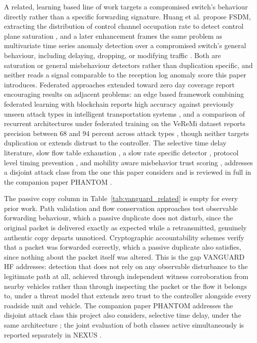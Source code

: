 \documentclass[final,5p,twocolumn]{elsarticle}
\theoremstyle{remark}
\theoremstyle{plain}
\begin{document}
A related, learning based line of work targets a compromised switch's
behaviour directly rather than a specific forwarding signature. Huang et
al. propose FSDM, extracting the distribution of control channel
occupation rate to detect control plane saturation \cite{Huang2020}, and
a later enhancement frames the same problem as multivariate time series
anomaly detection over a compromised switch's general behaviour,
including delaying, dropping, or modifying traffic \cite{Chi2020}. Both
are saturation or general misbehaviour detectors rather than duplication
specific, and neither reads a signal comparable to the reception log
anomaly score this paper introduces. Federated approaches extended toward
zero day coverage report encouraging results on adjacent problems: an
edge based framework combining federated learning with blockchain reports
high accuracy against previously unseen attack types in intelligent
transportation systems \cite{AbouElHouda2024}, and a comparison of
recurrent architectures under federated training on the VeReMi dataset
reports precision between 68 and 94 percent across attack types
\cite{Mansouri2024}, though neither targets duplication or extends
distrust to the controller. The selective time delay literature, slow
flow table exhaustion \cite{Pascoal2017,Pascoal2020DoS,Cao2022LOFT}, a
slow rate specific detector \cite{Tang2023SFTOGuard}, protocol level
timing prevention \cite{Arsalan2018}, and mobility aware misbehavior
trust scoring \cite{Nayak2022}, addresses a disjoint attack class from
the one this paper considers and is reviewed in full in the companion
paper PHANTOM \cite{Phantom2026}.

The passive copy column in Table~\ref{tab:vanguard_related} is empty for
every prior work. Path validation and flow conservation approaches test
observable forwarding behaviour, which a passive duplicate does not disturb,
since the original packet is delivered exactly as expected while a
retransmitted, genuinely authentic copy departs unnoticed. Cryptographic
accountability schemes verify that a packet was forwarded correctly, which a
passive duplicate also satisfies, since nothing about the packet itself was
altered. This is the gap VANGUARD HF addresses: detection that does not rely
on any observable disturbance to the legitimate path at all, achieved through
independent witness corroboration from nearby vehicles rather than through
inspecting the packet or the flow it belongs to, under a threat model that
extends zero trust to the controller alongside every roadside unit and
vehicle. The companion paper PHANTOM addresses the disjoint attack class this
project also considers, selective time delay, under the same architecture
\cite{Phantom2026}; the joint evaluation of both classes active
simultaneously is reported separately in NEXUS \cite{Nexus2026}.
\end{document}
